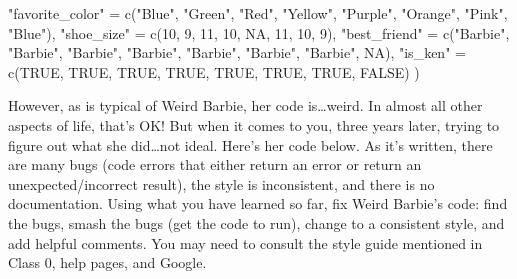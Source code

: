 \documentclass[
  letterpaper,
  DIV=11,
  numbers=noendperiod]{scrreprt}
\newenvironment{Shaded}{\begin{snugshade}}{\end{snugshade}}
\newcommand{\ConstantTok}[1]{\textcolor[rgb]{0.56,0.35,0.01}{#1}}
\newcommand{\DecValTok}[1]{\textcolor[rgb]{0.68,0.00,0.00}{#1}}
\newcommand{\FunctionTok}[1]{\textcolor[rgb]{0.28,0.35,0.67}{#1}}
\newcommand{\NormalTok}[1]{\textcolor[rgb]{0.00,0.23,0.31}{#1}}
\newcommand{\OtherTok}[1]{\textcolor[rgb]{0.00,0.23,0.31}{#1}}
\newcommand{\StringTok}[1]{\textcolor[rgb]{0.13,0.47,0.30}{#1}}
\begin{document}
\begin{Shaded}
\begin{Highlighting}[]
  \StringTok{"favorite\_color"} \OtherTok{=} \FunctionTok{c}\NormalTok{(}\StringTok{"Blue"}\NormalTok{, }\StringTok{"Green"}\NormalTok{, }\StringTok{"Red"}\NormalTok{, }\StringTok{"Yellow"}\NormalTok{, }\StringTok{"Purple"}\NormalTok{, }\StringTok{"Orange"}\NormalTok{, }\StringTok{"Pink"}\NormalTok{, }\StringTok{"Blue"}\NormalTok{),}
  \StringTok{"shoe\_size"} \OtherTok{=} \FunctionTok{c}\NormalTok{(}\DecValTok{10}\NormalTok{, }\DecValTok{9}\NormalTok{, }\DecValTok{11}\NormalTok{, }\DecValTok{10}\NormalTok{, }\ConstantTok{NA}\NormalTok{, }\DecValTok{11}\NormalTok{, }\DecValTok{10}\NormalTok{, }\DecValTok{9}\NormalTok{),}
  \StringTok{"best\_friend"} \OtherTok{=} \FunctionTok{c}\NormalTok{(}\StringTok{"Barbie"}\NormalTok{, }\StringTok{"Barbie"}\NormalTok{, }\StringTok{"Barbie"}\NormalTok{, }\StringTok{"Barbie"}\NormalTok{, }\StringTok{"Barbie"}\NormalTok{, }\StringTok{"Barbie"}\NormalTok{, }\StringTok{"Barbie"}\NormalTok{, }\ConstantTok{NA}\NormalTok{),}
  \StringTok{"is\_ken"} \OtherTok{=} \FunctionTok{c}\NormalTok{(}\ConstantTok{TRUE}\NormalTok{, }\ConstantTok{TRUE}\NormalTok{, }\ConstantTok{TRUE}\NormalTok{, }\ConstantTok{TRUE}\NormalTok{, }\ConstantTok{TRUE}\NormalTok{, }\ConstantTok{TRUE}\NormalTok{, }\ConstantTok{TRUE}\NormalTok{, }\ConstantTok{FALSE}\NormalTok{)}
\NormalTok{)}
\end{Highlighting}
\end{Shaded}

However, as is typical of Weird Barbie, her code is\ldots weird. In
almost all other aspects of life, that's OK! But when it comes to you,
three years later, trying to figure out what she did\ldots not ideal.
Here's her code below. As it's written, there are many bugs (code errors
that either return an error or return an unexpected/incorrect result),
the style is inconsistent, and there is no documentation. Using what you
have learned so far, fix Weird Barbie's code: find the bugs, smash the
bugs (get the code to run), change to a consistent style, and add
helpful comments. You may need to consult the style guide mentioned in
Class 0, help pages, and Google.
\end{document}
